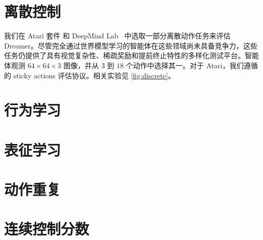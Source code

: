 \pagebreak
\section{离散控制}
\label{sec:discrete}

我们在 Atari 套件\citep{bellemare2013ale} 和 DeepMind Lab~\citep{beattie2016dmlab} 中选取一部分离散动作任务来评估 Dreamer。尽管完全通过世界模型学习的智能体在这些领域尚未具备竞争力\citep{kaiser2019simple}，这些任务仍提供了具有视觉复杂性、稀疏奖励和提前终止特性的多样化测试平台。智能体观测 $64\times64\times3$ 图像，并从 $3$ 到 $18$ 个动作中选择其一。对于 Atari，我们遵循 \citet{machado2018stickyactions} 的 sticky actions 评估协议。相关实验见 \cref{fig:discrete}。



\clearpage
\section{行为学习}
\label{sec:value-all}


\clearpage
\section{表征学习}
\label{sec:repr-all}


\clearpage
\section{动作重复}


\clearpage
\section{连续控制分数}

